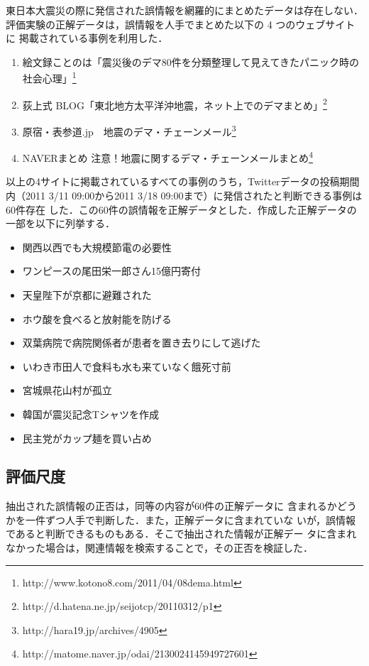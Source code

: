 \documentclass[japanese]{jnlp_1.4}
\begin{document}
東日本大震災の際に発信された誤情報を網羅的にまとめたデータは存在しない．
評価実験の正解データは，誤情報を人手でまとめた以下の 4 つのウェブサイトに
掲載されている事例を利用した．
\begin{enumerate}
 \item 絵文録ことのは「震災後のデマ80件を分類整理して見えてきたパニック時の社会心理」\footnote{http://www.kotono8.com/2011/04/08dema.html}
 \item 荻上式 BLOG「東北地方太平洋沖地震，ネット上でのデマまとめ」\footnote{http://d.hatena.ne.jp/seijotcp/20110312/p1}
 \item 原宿・表参道.jp　地震のデマ・チェーンメール\footnote{http://hara19.jp/archives/4905}
 \item NAVERまとめ 注意！地震に関するデマ・チェーンメールまとめ\footnote{http://matome.naver.jp/odai/2130024145949727601}
\end{enumerate}

以上の4サイトに掲載されているすべての事例のうち，Twitterデータの投稿期間内（2011 3/11 09:00から2011 3/18 09:00まで）に発信されたと判断できる事例は60件存在
した．この60件の誤情報を正解データとした．作成した正解データの一部を以下に列挙する．

\begin{itemize}
 \item 関西以西でも大規模節電の必要性
 \item ワンピースの尾田栄一郎さん15億円寄付
 \item 天皇陛下が京都に避難された
 \item ホウ酸を食べると放射能を防げる
 \item 双葉病院で病院関係者が患者を置き去りにして逃げた
 \item いわき市田人で食料も水も来ていなく餓死寸前
 \item 宮城県花山村が孤立
 \item 韓国が震災記念Tシャツを作成
 \item 民主党がカップ麺を買い占め
\end{itemize}


\subsection{評価尺度}

抽出された誤情報の正否は，同等の内容が60件の正解データに
含まれるかどうかを一件ずつ人手で判断した．また，正解データに含まれていな
いが，誤情報であると判断できるものもある．そこで抽出された情報が正解デー
タに含まれなかった場合は，関連情報を検索することで，その正否を検証した．
\end{document}
